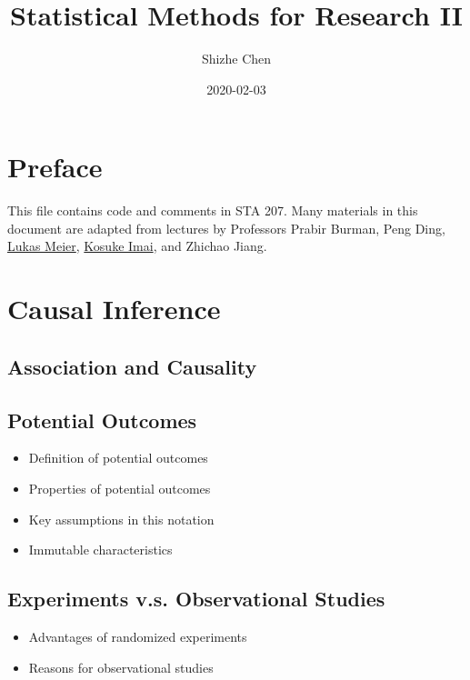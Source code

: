 \documentclass[12pt,]{book}
\title{Statistical Methods for Research II}
\author{Shizhe Chen}
\date{2020-02-03}
\providecommand{\tightlist}{%
  \setlength{\itemsep}{0pt}\setlength{\parskip}{0pt}}
\begin{document}
\maketitle

{
\setcounter{tocdepth}{1}
\tableofcontents
}
\chapter*{Preface}\label{pre}

This file contains code and comments in STA 207. Many materials in this
document are adapted from lectures by Professors Prabir Burman, Peng
Ding, \href{https://stat.ethz.ch/~meier/teaching/anova/}{Lukas Meier},
\href{https://imai.fas.harvard.edu/teaching/index.html}{Kosuke Imai},
and Zhichao Jiang.

\chapter{Causal Inference}\label{ch:causal}

\section{Association and Causality}\label{association-and-causality}

\section{Potential Outcomes}\label{potential-outcomes}

\begin{itemize}
\tightlist
\item
  Definition of potential outcomes
\item
  Properties of potential outcomes
\item
  Key assumptions in this notation
\item
  Immutable characteristics
\end{itemize}

\section{Experiments v.s. Observational
Studies}\label{experiments-v.s.-observational-studies}

\begin{itemize}
\tightlist
\item
  Advantages of randomized experiments
\item
  Reasons for observational studies
\end{itemize}
\end{document}
